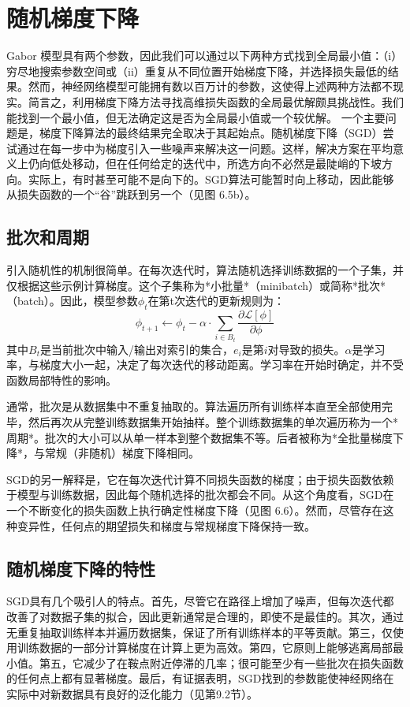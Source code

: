\section{随机梯度下降}
Gabor 模型具有两个参数，因此我们可以通过以下两种方式找到全局最小值：（i）穷尽地搜索参数空间或（ii）重复从不同位置开始梯度下降，并选择损失最低的结果。然而，神经网络模型可能拥有数以百万计的参数，这使得上述两种方法都不现实。简言之，利用梯度下降方法寻找高维损失函数的全局最优解颇具挑战性。我们能找到一个最小值，但无法确定这是否为全局最小值或一个较优解。
一个主要问题是，梯度下降算法的最终结果完全取决于其起始点。随机梯度下降（SGD）尝试通过在每一步中为梯度引入一些噪声来解决这一问题。这样，解决方案在平均意义上仍向低处移动，但在任何给定的迭代中，所选方向不必然是最陡峭的下坡方向。实际上，有时甚至可能不是向下的。SGD算法可能暂时向上移动，因此能够从损失函数的一个“谷”跳跃到另一个（见图 6.5b）。

\subsection{批次和周期}
引入随机性的机制很简单。在每次迭代时，算法随机选择训练数据的一个子集，并仅根据这些示例计算梯度。这个子集称为*小批量*（minibatch）或简称*批次*（batch）。因此，模型参数\(\phi_t\)在第t次迭代的更新规则为：
\begin{equation}
\phi_{t+1} \leftarrow \phi_t - \alpha \cdot \sum_{i \in B_t} \frac{\partial \mathcal{L}[\phi]}{\partial \phi} 
\end{equation}
其中\(B_t\)是当前批次中输入/输出对索引的集合，\(e_i\)是第\(i\)对导致的损失。\(\alpha\)是学习率，与梯度大小一起，决定了每次迭代的移动距离。学习率在开始时确定，并不受函数局部特性的影响。

通常，批次是从数据集中不重复抽取的。算法遍历所有训练样本直至全部使用完毕，然后再次从完整训练数据集开始抽样。整个训练数据集的单次遍历称为一个*周期*。批次的大小可以从单一样本到整个数据集不等。后者被称为*全批量梯度下降*，与常规（非随机）梯度下降相同。

SGD的另一解释是，它在每次迭代计算不同损失函数的梯度；由于损失函数依赖于模型与训练数据，因此每个随机选择的批次都会不同。从这个角度看，SGD在一个不断变化的损失函数上执行确定性梯度下降（见图 6.6）。然而，尽管存在这种变异性，任何点的期望损失和梯度与常规梯度下降保持一致。


\subsection{随机梯度下降的特性}
SGD具有几个吸引人的特点。首先，尽管它在路径上增加了噪声，但每次迭代都改善了对数据子集的拟合，因此更新通常是合理的，即使不是最佳的。其次，通过无重复抽取训练样本并遍历数据集，保证了所有训练样本的平等贡献。第三，仅使用训练数据的一部分计算梯度在计算上更为高效。第四，它原则上能够逃离局部最小值。第五，它减少了在鞍点附近停滞的几率；很可能至少有一些批次在损失函数的任何点上都有显著梯度。最后，有证据表明，SGD找到的参数能使神经网络在实际中对新数据具有良好的泛化能力（见第9.2节）。

